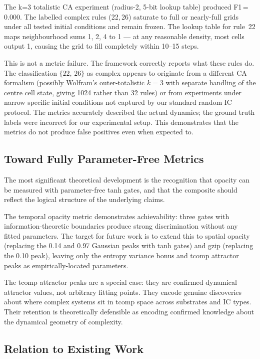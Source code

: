 \documentclass[12pt,a4paper]{article}
\begin{document}
The k=3 totalistic CA experiment (radius-2, 5-bit lookup table)
produced F1\,=\,0.000.
The labelled complex rules ({22,\,26}) saturate to full or nearly-full
grids under all tested initial conditions and remain frozen.
The lookup table for rule~22 maps neighbourhood sums 1, 2, 4 to 1 ---
at any reasonable density, most cells output 1, causing the grid to
fill completely within 10--15 steps.

This is not a metric failure.
The framework correctly reports what these rules do.
The classification $\{22,\,26\}$ as complex appears to originate from
a different CA formalism (possibly Wolfram's outer-totalistic $k=3$
with separate handling of the centre cell state, giving 1024 rather
than 32 rules) or from experiments under narrow specific initial
conditions not captured by our standard random IC protocol.
The metrics accurately described the actual dynamics; the ground truth
labels were incorrect for our experimental setup.
This demonstrates that the metrics do not produce false positives even
when expected to.

\subsection{Toward Fully Parameter-Free Metrics}

The most significant theoretical development is the recognition that
opacity can be measured with parameter-free tanh gates, and that the
composite should reflect the logical structure of the underlying
claims.

The temporal opacity metric demonstrates achievability: three gates
with information-theoretic boundaries produce strong discrimination
without any fitted parameters.
The target for future work is to extend this to spatial opacity
(replacing the 0.14 and 0.97 Gaussian peaks with tanh gates) and
gzip (replacing the 0.10 peak), leaving only the entropy variance
bonus and tcomp attractor peaks as empirically-located parameters.

The tcomp attractor peaks are a special case: they are confirmed
dynamical attractor values, not arbitrary fitting points.
They encode genuine discoveries about where complex systems sit in
tcomp space across substrates and IC types.
Their retention is theoretically defensible as encoding confirmed
knowledge about the dynamical geometry of complexity.

\subsection{Relation to Existing Work}
\end{document}
